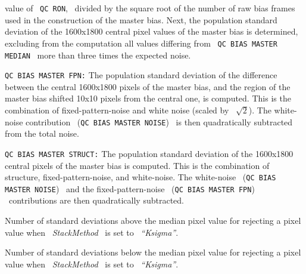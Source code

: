 \begin{description}
\begin{description}
                   value of \ {\tt QC RON}, \ divided by the square root of 
                   the number of raw bias frames used in the construction 
                   of the master bias.
                   Next, the population standard deviation of the 1600x1800
                   central pixel values of the master bias is determined,
                   excluding from the computation all values differing
                   from \ {\tt QC BIAS MASTER MEDIAN} \ more than three times 
                   the expected noise.
\item {\tt QC BIAS MASTER FPN:} The population standard deviation of 
                   the difference
                   between the central 1600x1800 pixels of the master
                   bias, and the region of the master bias shifted
                   10x10 pixels from the central one, is computed.
                   This is the combination of fixed-pattern-noise and
                   white noise (scaled by \ $\sqrt{2}$). The white-noise
                   contribution \ ({\tt QC BIAS MASTER NOISE}) \ is then 
                   quadratically subtracted from the total noise.
\item {\tt QC BIAS MASTER STRUCT:} The population standard deviation of 
                   the 1600x1800
                   central pixels of the master bias is computed. This
                   is the combination of structure, fixed-pattern-noise,
                   and white-noise. The white-noise 
                   \ ({\tt QC BIAS MASTER NOISE}) \ and the fixed-pattern-noise
                   \ ({\tt QC BIAS MASTER FPN}) \ contributions are then 
                   quadratically subtracted.

\end{description}

\item [KSigmaHigh:]  Number of standard deviations above the median pixel
                    value for rejecting a pixel value
                    when \ {\it StackMethod} \ is set to \ {\it ``Ksigma''}.

\item [KSigmaLow:]  Number of standard deviations below the median pixel
                    value for rejecting a pixel value
                    when \ {\it StackMethod} \ is set to \ {\it ``Ksigma''}.

%                          
%


\end{description}
